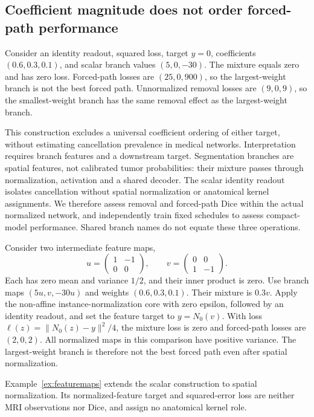 \documentclass[mathematics,article,submit,pdftex,moreauthors]{Definitions/mdpi}
\begin{document}
\subsection{Coefficient magnitude does not order forced-path performance}
\begin{Example}\label{ex:counter}
Consider an identity readout, squared loss, target $y=0$, coefficients
$(0.6,0.3,0.1)$, and scalar branch values $(5,0,-30)$. The mixture equals zero
and has zero loss. Forced-path losses are $(25,0,900)$, so the largest-weight
branch is not the best forced path. Unnormalized removal losses are $(9,0,9)$,
so the smallest-weight branch has the same removal effect as the
largest-weight branch.
\end{Example}
This construction excludes a universal coefficient ordering of either target,
without estimating cancellation prevalence in medical networks. Interpretation
requires branch features and a downstream target. Segmentation branches are
spatial features, not calibrated tumor probabilities: their mixture passes
through normalization, activation and a shared decoder. The scalar identity
readout isolates cancellation without spatial normalization or anatomical
kernel assignments. We therefore assess removal and forced-path Dice within
the actual normalized network, and independently train fixed schedules to
assess compact-model performance. Shared branch names do not equate these
three operations.

\begin{Example}\label{ex:featuremaps}
Consider two intermediate feature maps,
\[
 u=\begin{pmatrix}1&-1\\0&0\end{pmatrix},\qquad
 v=\begin{pmatrix}0&0\\1&-1\end{pmatrix}.
\]
Each has zero mean and variance $1/2$, and their inner product is zero.
Use branch maps $(5u,v,-30u)$ and weights $(0.6,0.3,0.1)$. Their mixture
is $0.3v$. Apply the non-affine instance-normalization core with zero
epsilon, followed by an identity readout, and set the feature target to
$y=N_0(v)$. With loss $\ell(z)=\|N_0(z)-y\|^2/4$, the mixture loss is
zero and forced-path losses are $(2,0,2)$. All normalized maps in this
comparison have positive variance. The largest-weight branch is therefore
not the best forced path even after spatial normalization.
\end{Example}
Example~\ref{ex:featuremaps} extends the scalar construction to spatial
normalization. Its normalized-feature target and squared-error loss are
neither MRI observations nor Dice, and assign no anatomical kernel role.
\end{document}
